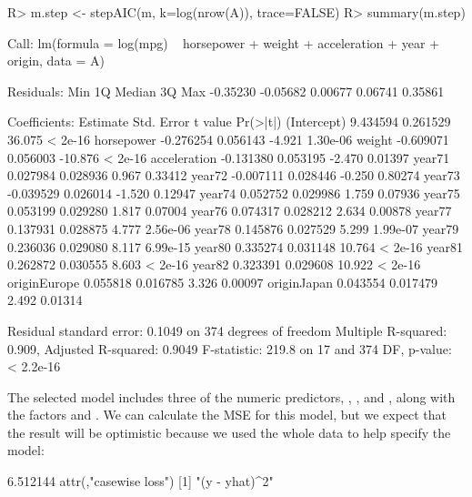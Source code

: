 \documentclass[
]{jss}
\begin{document}
\begin{CodeChunk}
\begin{CodeInput}
R> m.step <- stepAIC(m, k=log(nrow(A)), trace=FALSE)
R> summary(m.step)
\end{CodeInput}
\begin{CodeOutput}

Call:
lm(formula = log(mpg) ~ horsepower + weight + acceleration + 
    year + origin, data = A)

Residuals:
     Min       1Q   Median       3Q      Max 
-0.35230 -0.05682  0.00677  0.06741  0.35861 

Coefficients:
              Estimate Std. Error t value Pr(>|t|)
(Intercept)   9.434594   0.261529  36.075  < 2e-16
horsepower   -0.276254   0.056143  -4.921 1.30e-06
weight       -0.609071   0.056003 -10.876  < 2e-16
acceleration -0.131380   0.053195  -2.470  0.01397
year71        0.027984   0.028936   0.967  0.33412
year72       -0.007111   0.028446  -0.250  0.80274
year73       -0.039529   0.026014  -1.520  0.12947
year74        0.052752   0.029986   1.759  0.07936
year75        0.053199   0.029280   1.817  0.07004
year76        0.074317   0.028212   2.634  0.00878
year77        0.137931   0.028875   4.777 2.56e-06
year78        0.145876   0.027529   5.299 1.99e-07
year79        0.236036   0.029080   8.117 6.99e-15
year80        0.335274   0.031148  10.764  < 2e-16
year81        0.262872   0.030555   8.603  < 2e-16
year82        0.323391   0.029608  10.922  < 2e-16
originEurope  0.055818   0.016785   3.326  0.00097
originJapan   0.043554   0.017479   2.492  0.01314

Residual standard error: 0.1049 on 374 degrees of freedom
Multiple R-squared:  0.909, Adjusted R-squared:  0.9049 
F-statistic: 219.8 on 17 and 374 DF,  p-value: < 2.2e-16
\end{CodeOutput}
\end{CodeChunk}

The selected model includes three of the numeric predictors,
, , and , along with
the factors  and . We can calculate the MSE for
this model, but we expect that the result will be optimistic because we
used the whole data to help specify the model:

\begin{CodeChunk}
\begin{CodeOutput}
[1] 6.512144
attr(,"casewise loss")
[1] "(y - yhat)^2"
\end{CodeOutput}
\end{CodeChunk}
\end{document}
